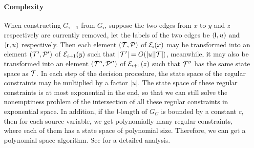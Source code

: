 \paragraph*{Complexity}
When constructing $G_{i+1}$ from $G_i$, suppose the two edges from $x$ to $y$
and $z$ respectively are currently removed, let the labels of the two edges be
$({\sf l}, u)$ and $({\sf r}, u)$ respectively. Then each element $(\mathcal{T}, \mathcal{P})$
of $\mathcal{E}_i(x)$ may be transformed into an element $(\mathcal{T}', \mathcal{P}')$ of
$\mathcal{E}_{i+1}(y)$ such that $|\mathcal{T}'| = O(|u||\mathcal{T}|)$, meanwhile, it may also be
transformed into an element $(\mathcal{T}'', \mathcal{P}'')$ of $\mathcal{E}_{i+1}(z)$ such that $\mathcal{T}''$
has the same state space as $\mathcal{T}$. In each step of the decision procedure, the
state space of the regular constraints may be multiplied by a factor $|u|$. The
state space of these regular constraints is at most exponential in the end, so
that we can still solve the nonemptiness problem of the intersection of all
these regular constraints in exponential space. In addition, if the
$\mathsf{l}$-length of $G_C$ is bounded by a constant $c$, then for each source
variable, we get polynomially many regular constraints, where each of them has a
state space of polynomial size. Therefore, we can get a polynomial space
algorithm. See  for a detailed analysis.



